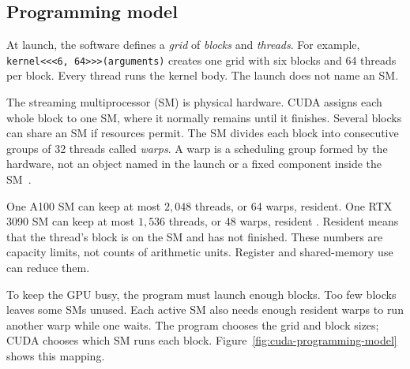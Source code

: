 \documentclass[11pt]{article}
\numberwithin{equation}{section}
\numberwithin{figure}{section}
\numberwithin{table}{section}
\newcommand{\code}[1]{\texttt{#1}}
\begin{document}
\subsection{Programming model}
\label{chap:model}

At launch, the software defines a \emph{grid} of \emph{blocks} and \emph{threads}.
For example, \code{kernel<<<6, 64>>>(arguments)} creates one grid with six blocks
and 64 threads per block.  Every thread runs the kernel body.  The launch does not
name an SM.

The streaming multiprocessor (SM) is physical hardware.  CUDA assigns each whole
block to one SM, where it normally remains until it finishes.  Several blocks can
share an SM if resources permit.  The SM divides each block into consecutive groups
of 32 threads called \emph{warps}.  A warp is a scheduling group formed by the
hardware, not an object named in the launch or a fixed component inside the
SM~\cite{cuda-programming-guide}.

One A100 SM can keep at most $2{,}048$ threads, or 64 warps, resident.  One RTX 3090
SM can keep at most $1{,}536$ threads, or 48 warps, resident
\cite{cuda-programming-guide}.  Resident means that the thread's block is on the SM
and has not finished.  These numbers are capacity limits, not counts of arithmetic
units.  Register and shared-memory use can reduce them.

To keep the GPU busy, the program must launch enough blocks.  Too few blocks leaves
some SMs unused.  Each active SM also needs enough resident warps to run another
warp while one waits.  The program chooses the grid and block sizes; CUDA chooses
which SM runs each block.  Figure~\ref{fig:cuda-programming-model} shows this
mapping.
\end{document}
